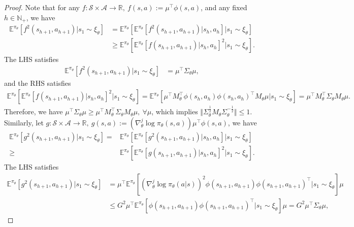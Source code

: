 \documentclass{article}
\numberwithin{equation}{section}
\begin{document}
\begin{proof}
Note that for any $f:\mathcal{S}\times\mathcal{A}\rightarrow \mathbb{R},\ f(s,a):=\mu^\top\phi(s, a)$, and any fixed $h\in\mathbb{N}_+$, we have
\begin{align*}
    \mathbb{E}^{\pi_\theta}\left[f^2(s_{h+1},a_{h+1})\vert s_1\sim\xi_\theta\right]&=\mathbb{E}^{\pi_\theta}\left[\mathbb{E}^{\pi_\theta}\left[f^2(s_{h+1},a_{h+1})\vert s_h,a_h\right]\vert s_1\sim\xi_\theta\right]\\
    &\geq\mathbb{E}^{\pi_\theta}[\mathbb{E}^{\pi_\theta}[f(s_{h+1},a_{h+1})\vert s_h,a_h]^2\vert  s_1\sim\xi_\theta].
\end{align*}
The LHS satisfies
\begin{align*}
    \mathbb{E}^{\pi_\theta}[f^2(s_{h+1},a_{h+1})\vert s_1\sim\xi_\theta]&=\mu^\top\Sigma_\theta\mu,
\end{align*}
and the RHS satisfies
\begin{align*}
    \mathbb{E}^{\pi_\theta}[\mathbb{E}^{\pi_\theta}[f(s_{h+1},a_{h+1})\vert s_h,a_h]^2\vert s_1\sim\xi_\theta]=\mathbb{E}^{\pi_\theta}[\mu^\top M_\theta^\top\phi(s_h,a_h)\phi(s_h,a_h)^\top M_\theta\mu\vert s_1\sim\xi_\theta]=\mu^\top M_\theta^\top\Sigma_\theta M_\theta\mu.
\end{align*}
Therefore, we have $\mu^\top\Sigma_\theta\mu\geq\mu^\top M_\theta^\top\Sigma_\theta M_\theta \mu,\ \forall\mu$, which implies $\Vert\Sigma_\theta^{\frac{1}{2}}M_\theta \Sigma_\theta^{-\frac{1}{2}}\Vert\leq 1$. Similarly, let $g:\mathcal{S}\times\mathcal{A}\rightarrow\mathbb{R},\ g(s, a):=\left(\nabla_\theta^j\log\pi_\theta(s,a)\right)\mu^\top\phi(s,a)$, we have
\begin{align*}
    \mathbb{E}^{\pi_\theta}[g^2(s_{h+1},a_{h+1})\vert s_1\sim\xi_\theta]=&\mathbb{E}^{\pi_\theta}[\mathbb{E}^{\pi_\theta}[g^2(s_{h+1},a_{h+1})\vert s_h,a_h]\vert s_1\sim\xi_\theta]\\
    \geq&\mathbb{E}^{\pi_\theta}[\mathbb{E}^{\pi_\theta}[g(s_{h+1},a_{h+1})\vert s_h,a_h]^2\vert s_1\sim\xi_\theta].
\end{align*}
The LHS satisfies
\begin{align*}
    \mathbb{E}^{\pi_\theta}[g^2(s_{h+1},a_{h+1})\vert s_1\sim\xi_\theta]&=\mu^\top\mathbb{E}^{\pi_\theta}\left[\left(\nabla_\theta^j\log\pi_\theta(a\vert s)\right)^2\phi(s_{h+1},a_{h+1})\phi(s_{h+1},a_{h+1})^\top\vert s_1\sim\xi_\theta\right]\mu\\
    &\leq G^2\mu^\top\mathbb{E}^{\pi_\theta}\left[\phi(s_{h+1},a_{h+1})\phi(s_{h+1},a_{h+1})^\top\vert s_1\sim\xi_\theta\right]\mu=G^2\mu^\top\Sigma_\theta\mu,

\end{align*}
\end{proof}
\end{document}
